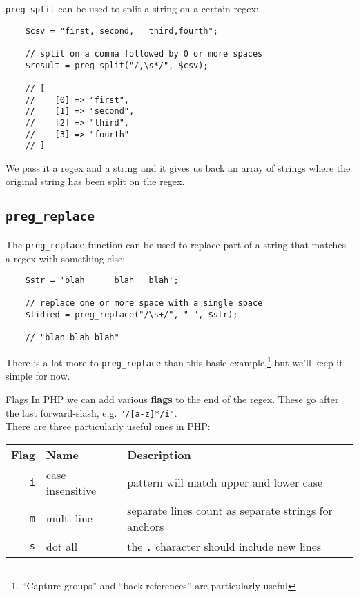 \texttt{preg\_split} can be used to split a string on a certain regex:

\begin{verbatim}
    $csv = "first, second,   third,fourth";

    // split on a comma followed by 0 or more spaces
    $result = preg_split("/,\s*/", $csv);

    // [
    //    [0] => "first",
    //    [1] => "second",
    //    [2] => "third",
    //    [3] => "fourth"
    // ]
\end{verbatim}

We pass it a regex and a string and it gives us back an array of strings where the original string has been split on the regex.

\subsection{\texttt{preg\_replace}}

The \texttt{preg\_replace} function can be used to replace part of a string that matches a regex with something else:

\begin{verbatim}
    $str = 'blah      blah   blah';

    // replace one or more space with a single space
    $tidied = preg_replace("/\s+/", " ", $str);

    // "blah blah blah"
\end{verbatim}


There is a lot more to \texttt{preg\_replace} than this basic example,\footnote{``Capture groups'' and ``back references'' are particularly useful} but we'll keep it simple for now.

\pagebreak

\begin{infobox}{Flags}
    In PHP we can add various \textbf{flags} to the end of the regex. These go after the last forward-slash, e.g. \texttt{"/[a-z]*/i"}.
    \\

    There are three particularly useful ones in PHP:
    \\

    \begin{tabularx}{\textwidth}{r l X}
        \textbf{Flag}    & \textbf{Name}    & \textbf{Description} \\
        \texttt{i}       & case insensitive & pattern will match upper and lower case \\
        \texttt{m}       & multi-line       & separate lines count as separate strings for anchors\\
        \texttt{s}       & dot all          & the \texttt{.} character should include new lines\\
    \end{tabularx}
\end{infobox}


